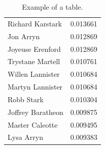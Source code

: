 \documentclass[9pt]{IEEEtran}
\begin{document}
 
\begin{table}
    \begin{center}
    \caption{Example of a table.}
        \begin{tabular}{ l | r }
        
        Richard Karstark & 0.013661 \\
        Jon Arryn & 0.012869 \\
        Joyeuse Erenford & 0.012869 \\
        Trystane Martell & 0.010761 \\
        Willen Lannister & 0.010684 \\
        Martyn Lannister & 0.010684 \\
        Robb Stark & 0.010304 \\
        Joffrey Baratheon & 0.009875 \\
        Master Caleotte & 0.009495 \\
        Lysa Arryn & 0.009383 \\
        \end{tabular}
    \label{tab:pagerankGOT}
    \end{center}
\end{table}





\end{document}
